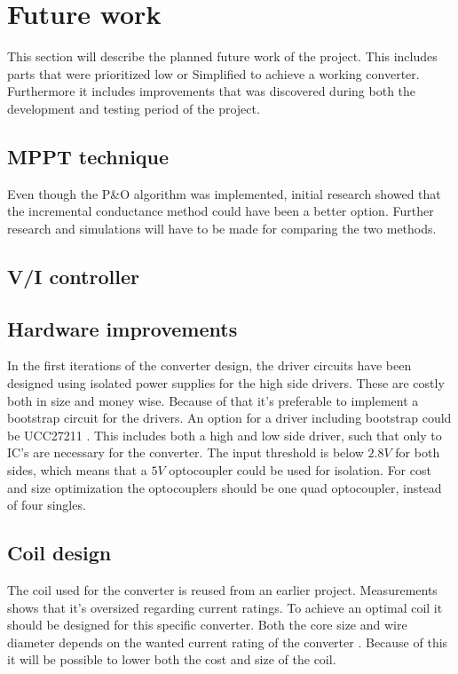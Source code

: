 \section{Future work}
This section will describe the planned future work of the project. This includes parts that were prioritized low or Simplified to achieve a working converter. Furthermore it includes improvements that was discovered during both the development and testing period of the project.


\subsection{MPPT technique}
Even though the P\&O algorithm was implemented, initial research showed that the incremental conductance method could have been a better option.  Further research and simulations will have to be made for comparing the two methods. 

\subsection{V/I controller}


\subsection{Hardware improvements}
In the first iterations of the converter design, the driver circuits have been designed using isolated power supplies for the high side drivers. These are costly both in size and money wise. Because of that it's preferable to implement a bootstrap circuit for the drivers. An option for a driver including bootstrap could be UCC27211 \cite{boot_driver_datasheet}. This includes both a high and low side driver, such that only to IC's are necessary for the converter. The input threshold is below $2.8V$ for both sides, which means that a $5V$ optocoupler could be used for isolation. For cost and size optimization the optocouplers should be one quad optocoupler, instead of four singles. 
 

\subsection{Coil design}
The coil used for the converter is reused from an earlier project. Measurements shows that it's oversized regarding current ratings. To achieve an optimal coil it should be designed for this specific converter. Both the core size and wire diameter depends on the wanted current rating of the converter \cite{underthehood}. Because of this it will be possible to lower both the cost and size of the coil. 


